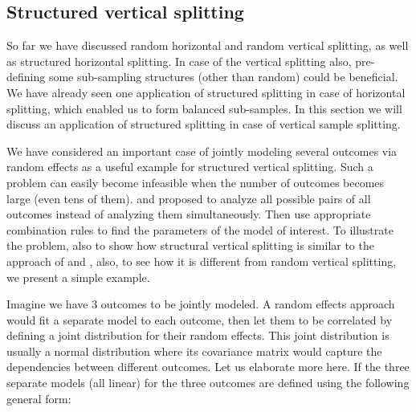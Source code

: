 \documentclass[11pt,a5paper,twoside]{book}
\begin{document}
\subsection{Structured vertical splitting} 

So far we have discussed random horizontal and random vertical splitting, as well as structured horizontal splitting. In case of the vertical splitting also, pre-defining some sub-sampling structures (other than random) could be beneficial. We have already seen one application of structured splitting in case of horizontal splitting, which enabled us to form balanced sub-samples. In this section we will discuss an application of structured splitting in case of vertical sample splitting.

We have considered an important case of jointly modeling several outcomes via random effects as a useful example for structured vertical splitting. Such a problem can easily become infeasible when the number of outcomes becomes large (even tens of them). \cite{fieuws2006} and \cite{fieuws2007} proposed to analyze all possible pairs of all outcomes instead of analyzing them simultaneously. Then use appropriate combination rules to find the parameters of the model of interest. To illustrate the problem, also to show how structural vertical splitting is similar to the approach of \cite{fieuws2006} and \cite{fieuws2007}, also, to see how it is different from random vertical splitting, we present a simple example. 

Imagine we have 3 outcomes to be jointly modeled. A random effects approach would fit a separate model to each outcome, then let them to be correlated by defining a joint distribution for their random effects. This joint distribution is usually a normal distribution where its covariance matrix would capture the dependencies between different outcomes. Let us elaborate more here. If the three separate models (all linear) for the three outcomes are defined using the following general form:
\end{document}
